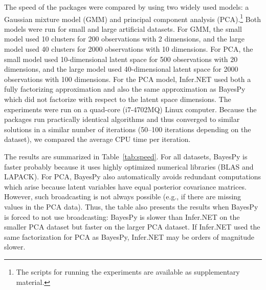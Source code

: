\documentclass[twoside,11pt]{article}
\begin{document}
The speed of the packages were compared by using two widely used models: a
Gaussian mixture model (GMM) and principal component analysis
(PCA).\footnote{The scripts for running the experiments are available as
  supplementary material.}  Both models were run for small and large artificial
datasets.  For GMM, the small model used 10 clusters for 200 observations with 2
dimensions, and the large model used 40 clusters for 2000 observations with 10
dimensions.  For PCA, the small model used 10-dimensional latent space for 500
observations with 20 dimensions, and the large model used 40-dimensional latent
space for 2000 observations with 100 dimensions.  For the PCA model, Infer.NET
used both a fully factorizing approximation and also the same approximation as
BayesPy which did not factorize with respect to the latent space dimensions.
The experiments were run on a quad-core (i7-4702MQ) Linux computer.
Because the packages run practically identical algorithms and thus
converged to similar solutions in a similar number of iterations (50--100
iterations depending on the dataset), we compared the average CPU time per
iteration.


The results are summarized in Table~\ref{tab:speed}.  For all datasets, BayesPy
is faster probably because it uses highly optimized numerical libraries (BLAS
and LAPACK).  For PCA, BayesPy also automatically avoids redundant computations
which arise because latent variables have equal posterior covariance matrices.
However, such broadcasting is not always possible (e.g., if there are missing
values in the PCA data).  Thus, the table also presents the results when BayesPy
is forced to not use broadcasting: BayesPy is slower than Infer.NET on the
smaller PCA dataset but faster on the larger PCA dataset.
If Infer.NET used the same factorization for PCA as BayesPy, Infer.NET may be
orders of magnitude slower.
%
\end{document}
